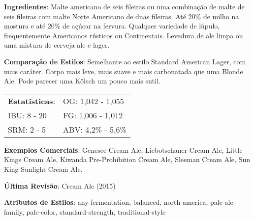 \textbf{Ingredientes}: Malte americano de seis fileiras ou uma combinação de malte de seis fileiras com malte Norte Americano de duas fileiras. Até 20\% de milho na mostura e até 20\% de açúcar na fervura. Qualquer variedade de lúpulo, frequentemente Americanos rústicos ou Continentais. Levedura de ale limpa ou uma mistura de cerveja ale e lager.

\textbf{Comparação de Estilos}: Semelhante ao estilo Standard American Lager, com mais caráter. Corpo mais leve, mais suave e mais carbonatada que uma Blonde Ale. Pode parecer uma Kölsch um pouco mais sutil.

\begin{tabular}{@{}p{35mm}p{35mm}@{}}
  \textbf{Estatísticas}: & OG: 1,042 - 1,055 \\
  IBU: 8 - 20  & FG: 1,006 - 1,012 \\
  SRM: 2 - 5  & ABV: 4,2\% - 5,6\%
\end{tabular}

\textbf{Exemplos Comerciais}: Genesee Cream Ale, Liebotschaner Cream Ale, Little Kings Cream Ale, Kiwanda Pre-Prohibition Cream Ale, Sleeman Cream Ale, Sun King Sunlight Cream Ale.

\textbf{Última Revisão}: Cream Ale (2015)

\textbf{Atributos de Estilos}: any-fermentation, balanced, north-america, pale-ale-family, pale-color, standard-strength, traditional-style

